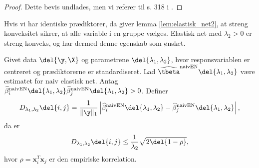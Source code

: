 %
\begin{proof}
Dette bevis undlades, men vi referer til s. 318 i \citep{zou_hastie}.
%
\end{proof}
Hvis vi har identiske prædiktorer, da giver lemma \ref{lem:elastisk_net2}, at streng konveksitet sikrer, at alle variable i en gruppe vælges.
Elastisk net med \(\lambda_2 > 0\) er streng konveks, og har dermed denne egenskab som ønsket.
%
\begin{thm} \label{thm:elastisk_net}
Givet data \(\del{\y, \X}\) og parametrene \(\del{\lambda_1, \lambda_2}\), hvor responsvariablen er centreret og prædiktorerne er standardiseret.
Lad \(\widehat{\tbeta}^\text{naivEN} \del{\lambda_1, \lambda_2}\) være estimatet for naiv elastisk net.
Antag \(\widehat{\beta}^\text{naivEN}_i \del{\lambda_1, \lambda_2} \widehat{\beta}^\text{naivEN}_j \del{\lambda_1, \lambda_2} > 0\).
Definer
\begin{align*}
D_{\lambda_1, \lambda_2} \del{i,j} = \frac{1}{\Vert \y \Vert_1} \left\vert \widehat{\beta}^\text{naivEN}_i \del{\lambda_1, \lambda_2} - \widehat{\beta}^\text{naivEN}_j \del{\lambda_1, \lambda_2} \right\vert,
\end{align*}
da er
\begin{align}
D_{\lambda_1, \lambda_2} \del{i,j} \leq \frac{1}{\lambda_2} \sqrt{2 \del{1-\rho}}, \label{eq:EN5}
\end{align}
hvor \(\rho = \mathbf{x}_i^T \mathbf{x}_j\) er den empiriske korrelation.
\end{thm}
